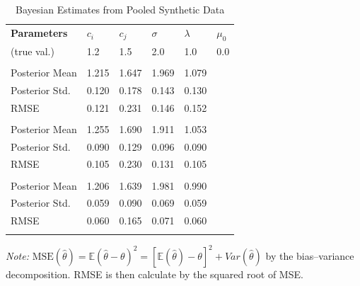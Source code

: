 \documentclass[mnsc]{informs3}
\begin{document}
\begin{table}[htbp]
\centering
\caption{Bayesian Estimates from Pooled Synthetic Data}\label{tbl-pool-synthetic-data}
\begin{tabularx}{\textwidth}{lYYYYY}
\toprule
\textbf{Parameters} & \textbf{$c_i$} & \textbf{$c_j$} & \textbf{$\sigma$} & \textbf{$\lambda$} & \textbf{$\mu_0$}\\
\addlinespace[0.25ex]
\addlinespace[0.25ex]
(true val.)        & 1.2 & 1.5 & 2.0 & 1.0 & 0.0\\
\midrule
\addlinespace
{} \\
Posterior Mean  & 1.215 & 1.647 & 1.969 & 1.079 &\\
Posterior Std.    & 0.120 & 0.178 & 0.143 & 0.130 &\\
RMSE               & 0.121 & 0.231 & 0.146 & 0.152 &\\
\addlinespace
{} \\
Posterior Mean  & 1.255 & 1.690 & 1.911 & 1.053 &\\
Posterior Std.    & 0.090 & 0.129 & 0.096 & 0.090 &\\
RMSE               & 0.105 & 0.230 & 0.131 & 0.105 &\\
\addlinespace
{} \\
Posterior Mean  & 1.206 & 1.639 & 1.981 & 0.990 &\\
Posterior Std.    & 0.059 & 0.090 & 0.069 & 0.059 &\\
RMSE               & 0.060 & 0.165 & 0.071 & 0.060 &\\
\bottomrule
\addlinespace[0.5ex]
\end{tabularx}
\begin{minipage}{\textwidth}
{\footnotesize
\textit{Note:} $\text{MSE}(\hat\theta) = \mathbb{E}(\hat{\theta}-\theta)^2 = [\mathbb{E}(\hat{\theta}) - \theta]^2 + Var(\hat{\theta})$ by the bias–variance decomposition. RMSE is then calculate by the squared root of MSE. 
}
\end{minipage}
\end{table}

\end{document}
